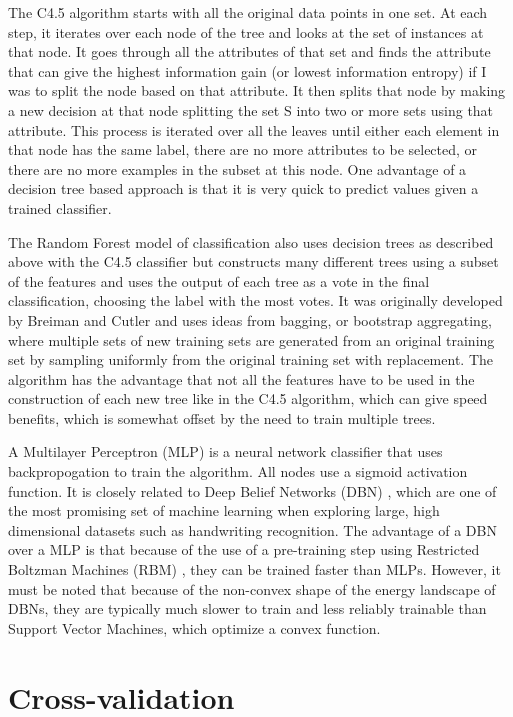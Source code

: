 The C4.5 algorithm starts with all the original data points in one
set.  At each step, it iterates over each node of the tree and looks
at the set of instances at that node.  It goes through all the
attributes of that set and finds the attribute that can give the
highest information gain (or lowest information entropy) if I was to
split the node based on that attribute.  It then splits that node by
making a new decision at that node splitting the set S into two or
more sets using that attribute.  This process is iterated over all the
leaves until either each element in that node has the same label,
there are no more attributes to be selected, or there are no more
examples in the subset at this node.  One advantage of a decision tree
based approach is that it is very quick to predict values given a
trained classifier.

The Random Forest model of classification also uses decision trees as
described above with the C4.5 classifier but constructs many
different trees using a subset of the features and uses the output of
each tree as a vote in the final classification, choosing the label
with the most votes.  It was originally developed by Breiman and
Cutler \cite{breiman2001random} and uses ideas from bagging, or
bootstrap aggregating, where multiple sets of new training sets are
generated from an original training set by sampling uniformly from the
original training set with replacement.  The algorithm has the
advantage that not all the features have to be used in the
construction of each new tree like in the C4.5 algorithm, which can
give speed benefits, which is somewhat offset by the need to train
multiple trees.

A Multilayer Perceptron (MLP) \cite{ruck1990multilayer} is a neural
network classifier that uses backpropogation to train the algorithm.
All nodes use a sigmoid activation function.  It is closely related to
Deep Belief Networks (DBN) \cite{rumelhart2002learning}, which are one
of the most promising set of machine learning when exploring large,
high dimensional datasets such as handwriting recognition. The
advantage of a DBN over a MLP is that because of the use of a
pre-training step using Restricted Boltzman Machines (RBM)
\cite{hinton2006fast}, they can be trained faster than MLPs.  However,
it must be noted that because of the non-convex shape of the energy
landscape of DBNs, they are typically much slower to train and less
reliably trainable than Support Vector Machines, which optimize a
convex function.

\section{Cross-validation}
\label{section:analysis:crossvalidation}

